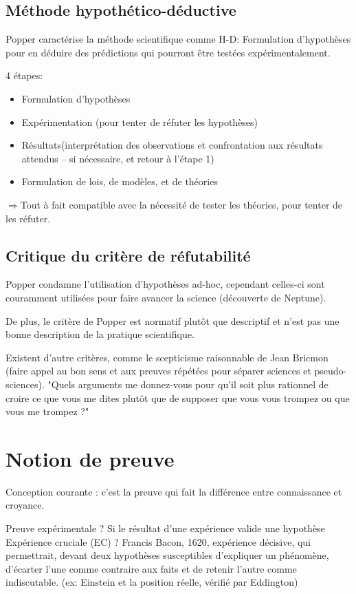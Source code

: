 \documentclass{report}
\begin{document}
	\subsection{Méthode hypothético-déductive}
	
	Popper caractérise la méthode scientifique comme H-D: Formulation d’hypothèses pour en déduire des prédictions qui pourront être testées expérimentalement.
	
	4 étapes:
	\begin{itemize}
		\item Formulation d’hypothèses
		\item Expérimentation (pour tenter de réfuter les hypothèses)
		\item Résultats(interprétation des observations et confrontation aux résultats attendus – si nécessaire, et retour à l’étape 1)
		\item Formulation de lois, de modèles, et de théories
	\end{itemize}
	$\Rightarrow$Tout à fait compatible avec la nécessité de tester les théories, pour tenter de les réfuter.
	
	\subsection{Critique du critère de réfutabilité}
	
	Popper condamne l'utilisation d'hypothèses ad-hoc, cependant celles-ci sont couramment utilisées pour faire avancer la science (découverte de Neptune).
	
	De plus, le critère de Popper est normatif plutôt que descriptif et n'est pas une bonne description de la pratique scientifique.
	
	Existent d'autre critères, comme le scepticisme raisonnable de Jean Bricmon (faire appel au bon sens et aux preuves répétées pour séparer sciences et pseudo-sciences). "Quels arguments me donnez-vous pour qu’il soit plus rationnel de croire ce que vous me dites plutôt que de supposer que vous vous trompez ou que vous me trompez ?"
	
	\section{Notion de preuve}
	
	Conception courante : c’est la preuve qui fait la différence entre connaissance et croyance.
	
	Preuve expérimentale ? Si le résultat d'une expérience valide une hypothèse\\
	Expérience cruciale (EC) ? Francis Bacon, 1620, expérience décisive, qui permettrait, devant deux hypothèses susceptibles d'expliquer un phénomène, d'écarter l'une comme contraire aux faits et de retenir l'autre comme indiscutable. (ex: Einstein et la position réelle, vérifié par Eddington)
	
\end{document}
